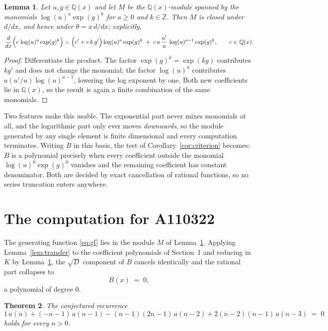 \documentclass[11pt,a4paper]{article}
\theoremstyle{plain}
\newtheorem{theorem}{Theorem}
\newtheorem{lemma}[theorem]{Lemma}
\theoremstyle{definition}
\begin{document}
\begin{lemma}\label{lem:field}
Let $u,g\in\mathbb{Q}(x)$ and let $M$ be the $\mathbb{Q}(x)$-module spanned by the
monomials $\log(u)^{a}\exp(g)^{k}$ for $a\ge0$ and $k\in\mathbb{Z}$. Then $M$ is closed
under $d/dx$, and hence under $\theta=x\,d/dx$; explicitly,
\[
\frac{d}{dx}\Bigl(c\,\log(u)^{a}\exp(g)^{k}\Bigr)
=\Bigl(c'+c\,k\,g'\Bigr)\log(u)^{a}\exp(g)^{k}
\;+\;c\,a\,\frac{u'}{u}\,\log(u)^{a-1}\exp(g)^{k},
\qquad c\in\mathbb{Q}(x).
\]
\end{lemma}

\begin{proof}
Differentiate the product. The factor $\exp(g)^{k}=\exp(kg)$ contributes $kg'$ and does
not change the monomial; the factor $\log(u)^{a}$ contributes $a(u'/u)\log(u)^{a-1}$,
lowering the log exponent by one. Both new coefficients lie in $\mathbb{Q}(x)$, so the
result is again a finite combination of the same monomials.
\end{proof}

Two features make this usable. The exponential part never mixes monomials at all, and the
logarithmic part only ever moves \emph{downwards}, so the module generated by any single
element is finite dimensional and every computation terminates. Writing $B$ in this basis,
the test of Corollary~\ref{cor:criterion} becomes: $B$ is a polynomial precisely when every
coefficient outside the monomial $\log(u)^{0}\exp(g)^{0}$ vanishes and the remaining
coefficient has constant denominator. Both are decided by exact cancellation of rational
functions, so no series truncation enters anywhere.

\section{The computation for A110322}

The generating function \eqref{eq:gf} lies in the module $M$ of
Lemma~\ref{lem:field}.
Applying Lemma~\ref{lem:transfer} to the coefficient polynomials of Section~1 and reducing
in $K$ by Lemma~\ref{lem:field}, the $\sqrt{D}$ component of $B$ cancels identically and
the rational part collapses to
\[
B(x)\;=\;0 ,
\]
a polynomial of degree $0$.

\begin{theorem}
The conjectured recurrence
\[
1\,a(n) + (- n - 1)\,a(n-1) -  \left(n - 1\right) \left(2 n - 1\right)\,a(n-2) + 2 \left(n - 2\right) \left(n - 1\right)\,a(n-3) \;=\;0
\]
holds for every $n>0$.
\end{theorem}
\end{document}
